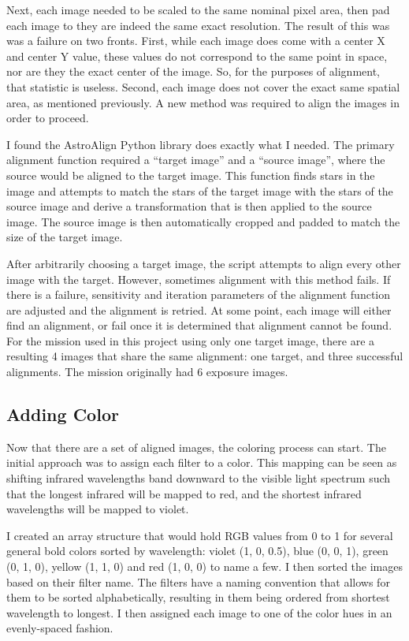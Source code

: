 \documentclass[10pt,twocolumn,letterpaper]{article}
\begin{document}
Next, each image needed to be scaled to the same nominal pixel area, then pad each image to they are indeed the same exact resolution. The result of this was was a failure on two fronts. First, while each image does come with a center X and center Y value, these values do not correspond to the same point in space, nor are they the exact center of the image. 
So, for the purposes of alignment, that statistic is useless. Second, each image does not cover the exact same spatial area, as mentioned previously. A new method was required to align the images in order to proceed.

I found the AstroAlign Python library does exactly what I needed. The primary alignment function required a ``target image'' and a ``source image'', where the source would be aligned to the target image. This function finds stars in the image and attempts to match the stars of the target image with the stars of the source image and derive a transformation that is then applied to the source image. The source image is then automatically cropped and padded to match the size of the target image.

After arbitrarily choosing a target image, the script attempts to align every  other image with the target. However, sometimes alignment with this method fails. If there is a failure, sensitivity and iteration parameters of the alignment function are adjusted and the alignment is retried. 
At some point, each image will either find an alignment, or fail once it is determined that alignment cannot be found. For the mission used in this project using only one target image, there are a resulting 4 images that share the same alignment: one target, and three successful alignments. The mission originally had 6 exposure images.

\subsection{Adding Color}
Now that there are a set of aligned images, the coloring process can start. The initial approach was to assign each filter to a color. This mapping can be seen as shifting infrared wavelengths band downward to the visible light spectrum such that the longest infrared will be mapped to red, and the shortest infrared wavelengths will be mapped to violet.

I created an array structure that would hold RGB values from 0 to 1 for several general bold colors sorted by wavelength: violet (1, 0, 0.5), blue (0, 0, 1), green (0, 1, 0), yellow (1, 1, 0) and red (1, 0, 0) to name a few. I then sorted the images based on their filter name. The filters have a naming convention that allows for them to be sorted alphabetically, resulting in them being ordered from shortest wavelength to longest. I then assigned each image to one of the color hues in an evenly-spaced fashion.
\end{document}

